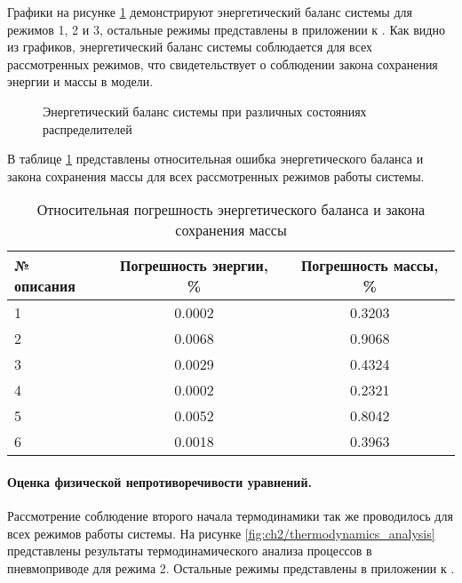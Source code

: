 Графики на рисунке \ref{fig:ch2/energy_balance} демонстрируют энергетический баланс системы для режимов 1, 2 и 3, остальные
режимы представлены в приложении к . Как видно из графиков, энергетический баланс системы соблюдается
для всех рассмотренных режимов, что свидетельствует о соблюдении закона сохранения энергии и массы в модели.

\begin{figure}[ht]
    \caption{Энергетический баланс системы при различных состояниях распределителей}
    \label{fig:ch2/energy_balance}

\end{figure}

В таблице \ref{tab:ch2/energy_balance} представлены относительная ошибка
энергетического баланса и закона сохранения массы
для всех рассмотренных режимов работы системы.

\begin{table}[h]
    \centering
    \caption{Относительная погрешность энергетического баланса и закона сохранения массы}
    \begin{tabular}{l|c|c}
        \midrule
        № описания & Погрешность энергии, \% & Погрешность массы, \% \\
        \midrule
        1          & \num{0.0002}                  & \num{0.3203}                \\
        \hline
        2          & \num{0.0068}                  & \num{0.9068}                \\
        \hline
        3          & \num{0.0029}                  & \num{0.4324}                \\
        \hline
        4          & \num{0.0002}                  & \num{0.2321}                \\
        \hline
        5          & \num{0.0052}                  & \num{0.8042}                \\
        \hline
        6          & \num{0.0018}                  & \num{0.3963}                \\
        \midrule
    \end{tabular}
    \label{tab:ch2/energy_balance}
\end{table}

\paragraph{Оценка физической непротиворечивости уравнений.} 
Рассмотрение соблюдение второго начала термодинамики так же проводилось для всех режимов работы системы. На рисунке
\ref{fig:ch2/thermodynamics_analysis} представлены результаты термодинамического анализа процессов в пневмоприводе 
для режима 2. Остальные режимы представлены в приложении к .

